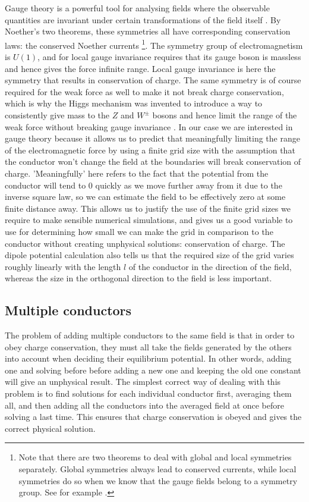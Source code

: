 \documentclass[aps,twocolumn,pre,nofootinbib]{revtex4-1}
\begin{document}
Gauge theory is a powerful tool for analysing fields where the observable quantities are invariant under certain transformations of the field itself \cite{gaugetheory1}. By Noether's two theorems, these symmetries all have corresponding conservation laws: the conserved Noether currents \footnote{Note that there are two theorems to deal with global and local symmetries separately. Global symmetries always lead to conserved currents, while local symmetries do so when we know that the gauge fields belong to a symmetry group. See for example \cite{gaugetheory2}.}. The symmetry group of electromagnetism is $U(1)$, and for local gauge invariance requires that its gauge boson is massless and hence gives the force infinite range. Local gauge invariance is here the symmetry that results in conservation of charge. The same symmetry is of course required for the weak force as well to make it not break charge conservation, which is why the Higgs mechanism was invented to introduce a way to consistently give mass to the $Z$ and $W^{\pm}$ bosons and hence limit the range of the weak force without breaking gauge invariance \cite{gaugetheory3}. In our case we are interested in gauge theory because it allows us to predict that meaningfully limiting the range of the electromagnetic force by using a finite grid size with the assumption that the conductor won't change the field at the 
boundaries will break conservation of charge. 'Meaningfully' here refers to the fact that the potential from the conductor will tend to 0 quickly as we move further away from it due to the inverse square law, so we can estimate the field to be effectively zero at some finite distance away. This allows us to justify the use of the finite grid sizes we require to make sensible numerical simulations, and gives us a good variable to use for determining how small we can make the grid in comparison to the conductor without creating unphysical solutions: conservation of charge. The dipole potential calculation also tells us that the required size of the grid varies roughly linearly with the length $l$ of the conductor in the direction of the field, whereas the size in the orthogonal direction to the field is less important.

\subsection*{Multiple conductors}
The problem of adding multiple conductors to the same field is that in order to obey charge conservation, they must all take the fields generated by the others into account when deciding their equilibrium potential. In other words, adding one and solving before before adding a new one and keeping the old one constant will give an unphysical result. The simplest correct way of dealing with this problem is to find solutions for each individual conductor first, averaging them all, and then adding all the conductors into the averaged field at once before solving a last time. This ensures that charge conservation is obeyed and gives the correct physical solution.
\end{document}
